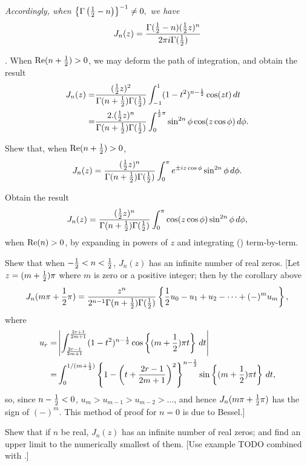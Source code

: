 \documentclass{book}
\begin{document}
\emph{Accordingly, when
  $
  \left\{ \Gamma\left( \frac{1}{2}-n \right) \right\}^{-1} \neq 0,
  $
  we have
  }
$$
J_n(z)
=
\frac{ \Gamma(\frac{1}{2}-n) (\frac{1}{2} z)^n }{ 2\pi i \Gamma(\frac{1}{2})}
$$

\corollary. When $\mathrm{Re}(n+\frac{1}{2}) > 0$, we may deform the path of
integration, and obtain the result
\begin{align*}
  J_n(z)
  =&
  \frac{ (\frac{1}{2} z)^2 }{ \Gamma(n+\frac{1}{2}) \Gamma(\frac{1}{2}) }
  \int_{-1}^1 (1-t^2)^{n-\frac{1}{2}} \cos(zt) \, d t
  \\
  =&
  \frac{2 . (\frac{1}{2} z)^n }{ \Gamma(n+\frac{1}{2}) \Gamma(\frac{1}{2}) }
  \int_0^{\frac{1}{2} \pi} \sin^{2n}\phi \cos(z \cos\phi) \, d\phi.
\end{align*}
\begin{wandwexample}
  Shew that, when $\mathrm{Re}(n+\frac{1}{2}) > 0$,
  $$
  J_n(z)
  =
  \frac{ (\frac{1}{2} z)^n }{ \Gamma(n+\frac{1}{2}) \Gamma(\frac{1}{2}) }
  \int_0^{\pi} e^{\pm iz\cos\phi} \sin^{2n}\phi \, d\phi.
  $$
\end{wandwexample}
\begin{wandwexample}
  Obtain the result
  $$
  J_n(z)
  =
  \frac{ (\frac{1}{2} z)^n }{ \Gamma(n+\frac{1}{2}) \Gamma(\frac{1}{2}) }
  \int_0^{\pi} \cos(z\cos\phi) \sin^{2n}\phi \, d\phi,
  $$
  when $\mathrm{Re}(n) > 0$, by expanding in powers of $z$ and
  integrating
  () term-by-term.
\end{wandwexample}
%
%
\begin{wandwexample}
  Shew that when $-\frac{1}{2} < n < \frac{1}{2}$, $J_n(z)$ has an infinite number
  of real zeros. [Let $z = (m+\frac{1}{2})\pi$ where $m$ is zero or a
  positive integer; then by the corollary above
  $$
  J_n(m\pi + \frac{1}{2}\pi)
  =
  \frac{z^n}{2^{n-1} \Gamma(n+\frac{1}{2}) \Gamma(\frac{1}{2})}
  \left\{  \frac{1}{2} u_0 - u_1 + u_2 - \cdots + (-)^m u_m \right\},
  $$
  where
  \begin{align*}
    u_r
    =&
    \left| 
      \int_{\frac{2r-1}{2m+1}}^{\frac{2r+1}{2m+1}}
      (1-t^2)^{n-\frac{1}{2}} \cos \left\{ (m+\frac{1}{2})\pi t \right\}
      \, d t
     \right|
    \\
    =&
    \int_0^{1/(m+\frac{1}{2})}
    \left\{ 
      1
      -
      \left( t + \frac{2r-1}{2m+1} \right)^2
     \right\}^{n-\frac{1}{2}}
    \sin\left\{  (m+\frac{1}{2})\pi t  \right\}
    \, d t,
  \end{align*}
  so, since $n - \frac{1}{2} < 0$, $u_m > u_{m-1} > u_{m-2} > \ldots$, and
  hence $J_n(m\pi + \frac{1}{2}\pi)$ has the sign of $(-)^m$.
  This method of proof for $n=0$ is due to Bessel.]
\end{wandwexample}
\begin{wandwexample}
  Shew that if $n$ be real, $J_n(z)$ has an infinite number of real
  zeros; and find an upper limit to the numerically smallest of them.
  [Use example TODO combined with .]
\end{wandwexample}
\end{document}

